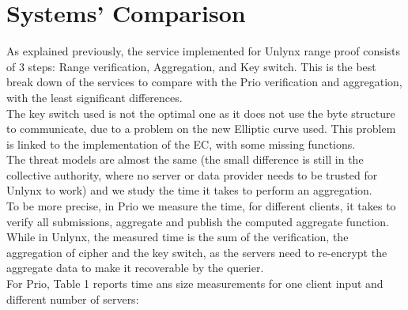 \documentclass{article}
\begin{document}
\section{Systems' Comparison}
As explained previously, the service implemented for Unlynx range proof consists of 3 steps: Range verification, Aggregation, and Key switch. This is the best break down of the services to compare with the Prio verification and aggregation, with the least significant differences.\\
The key switch used is not the optimal one as it does not use the byte structure to communicate, due to a problem on the new Elliptic curve used. This problem is linked to the implementation of the EC, with some missing functions.\\

The threat models are almost the same (the small difference is still in the collective authority, where no server or data provider needs to be trusted for Unlynx to work) and we study the time it takes to perform an aggregation.\\
To be more precise, in Prio we measure the time, for different clients, it takes to verify all submissions, aggregate and publish the computed aggregate function.
While in Unlynx, the measured time is the sum of the verification, the aggregation of cipher and the key switch, as the servers need to re-encrypt the aggregate data to make it recoverable by the querier.\\

For Prio, Table 1 reports time ans size measurements for one client input and different number of servers:\\
\end{document}
